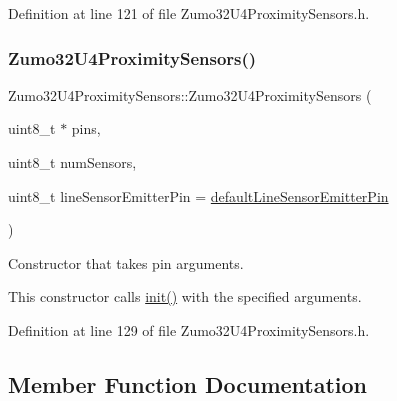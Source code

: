Definition at line 121 of file Zumo32\+U4\+Proximity\+Sensors.\+h.

\mbox{\label{class_zumo32_u4_proximity_sensors_a09d74928abeea79a5eed616655c1429e}} 
\subsubsection{\texorpdfstring{Zumo32\+U4\+Proximity\+Sensors()}{Zumo32U4ProximitySensors()}\hspace{0.1cm}{\footnotesize\ttfamily [2/2]}}
{\footnotesize\ttfamily Zumo32\+U4\+Proximity\+Sensors\+::\+Zumo32\+U4\+Proximity\+Sensors (\begin{DoxyParamCaption}\item[{uint8\+\_\+t $\ast$}]{pins,  }\item[{uint8\+\_\+t}]{num\+Sensors,  }\item[{uint8\+\_\+t}]{line\+Sensor\+Emitter\+Pin = {\ttfamily \hyperlink{class_zumo32_u4_proximity_sensors_a7d6a79ab499972b36c52d2a8c03fe0f7}{default\+Line\+Sensor\+Emitter\+Pin}} }\end{DoxyParamCaption})\hspace{0.3cm}{\ttfamily [inline]}}



Constructor that takes pin arguments. 

This constructor calls \hyperlink{class_zumo32_u4_proximity_sensors_a250ef26e66807bc800adc42be912fab5}{init()} with the specified arguments. 

Definition at line 129 of file Zumo32\+U4\+Proximity\+Sensors.\+h.



\subsection{Member Function Documentation}
\mbox{\label{class_zumo32_u4_proximity_sensors_a9c9f5ada0b3e7b8bc14dc97bf9681090}} 

